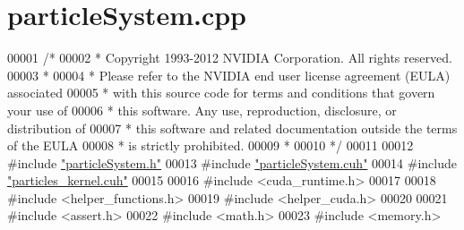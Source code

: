 \hypertarget{particle_system_8cpp_source}{\section{particle\-System.\-cpp}
}

\begin{DoxyCode}
00001 \textcolor{comment}{/*}
00002 \textcolor{comment}{ * Copyright 1993-2012 NVIDIA Corporation.  All rights reserved.}
00003 \textcolor{comment}{ *}
00004 \textcolor{comment}{ * Please refer to the NVIDIA end user license agreement (EULA) associated}
00005 \textcolor{comment}{ * with this source code for terms and conditions that govern your use of}
00006 \textcolor{comment}{ * this software. Any use, reproduction, disclosure, or distribution of}
00007 \textcolor{comment}{ * this software and related documentation outside the terms of the EULA}
00008 \textcolor{comment}{ * is strictly prohibited.}
00009 \textcolor{comment}{ *}
00010 \textcolor{comment}{ */}
00011 
00012 \textcolor{preprocessor}{#}\textcolor{preprocessor}{include} \hyperlink{particle_system_8h}{"particleSystem.h"}
00013 \textcolor{preprocessor}{#}\textcolor{preprocessor}{include} \hyperlink{particle_system_8cuh}{"particleSystem.cuh"}
00014 \textcolor{preprocessor}{#}\textcolor{preprocessor}{include} \hyperlink{particles__kernel_8cuh}{"particles\_kernel.cuh"}
00015 
00016 \textcolor{preprocessor}{#}\textcolor{preprocessor}{include} \textcolor{preprocessor}{<}\textcolor{preprocessor}{cuda\_runtime}\textcolor{preprocessor}{.}\textcolor{preprocessor}{h}\textcolor{preprocessor}{>}
00017 
00018 \textcolor{preprocessor}{#}\textcolor{preprocessor}{include} \textcolor{preprocessor}{<}\textcolor{preprocessor}{helper\_functions}\textcolor{preprocessor}{.}\textcolor{preprocessor}{h}\textcolor{preprocessor}{>}
00019 \textcolor{preprocessor}{#}\textcolor{preprocessor}{include} \textcolor{preprocessor}{<}\textcolor{preprocessor}{helper\_cuda}\textcolor{preprocessor}{.}\textcolor{preprocessor}{h}\textcolor{preprocessor}{>}
00020 
00021 \textcolor{preprocessor}{#}\textcolor{preprocessor}{include} \textcolor{preprocessor}{<}\textcolor{preprocessor}{assert}\textcolor{preprocessor}{.}\textcolor{preprocessor}{h}\textcolor{preprocessor}{>}
00022 \textcolor{preprocessor}{#}\textcolor{preprocessor}{include} \textcolor{preprocessor}{<}\textcolor{preprocessor}{math}\textcolor{preprocessor}{.}\textcolor{preprocessor}{h}\textcolor{preprocessor}{>}
00023 \textcolor{preprocessor}{#}\textcolor{preprocessor}{include} \textcolor{preprocessor}{<}\textcolor{preprocessor}{memory}\textcolor{preprocessor}{.}\textcolor{preprocessor}{h}\textcolor{preprocessor}{>}

\end{DoxyCode}
